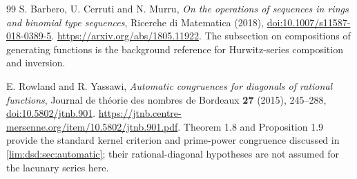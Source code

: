 \documentclass[11pt]{article}
\theoremstyle{definition}
\theoremstyle{remark}
\begin{document}
\begin{thebibliography}{99}
S. Barbero, U. Cerruti and N. Murru,
\emph{On the operations of sequences in rings and binomial type sequences},
Ricerche di Matematica (2018),
\href{https://doi.org/10.1007/s11587-018-0389-5}{doi:10.1007/s11587-018-0389-5}.
\url{https://arxiv.org/abs/1805.11922}.
The subsection on compositions of generating functions is the
background reference for Hurwitz-series composition and inversion.

E. Rowland and R. Yassawi,
\emph{Automatic congruences for diagonals of rational functions},
Journal de th\'eorie des nombres de Bordeaux \textbf{27} (2015),
245--288,
\href{https://doi.org/10.5802/jtnb.901}{doi:10.5802/jtnb.901}.
\url{https://jtnb.centre-mersenne.org/item/10.5802/jtnb.901.pdf}.
Theorem 1.8 and Proposition 1.9 provide the standard kernel
criterion and prime-power congruence discussed in
\cref{lim:dsd:sec:automatic}; their rational-diagonal hypotheses are not
assumed for the lacunary series here.

\end{thebibliography}
\end{document}
